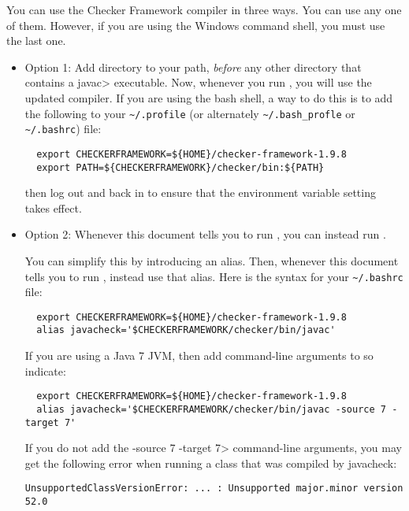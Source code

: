 You can use the Checker Framework compiler in three ways.  You can use any
one of them.  However, if you are using the Windows command shell, you must
use the last one.


\begin{itemize}
  \item
    Option 1:
    Add directory
     to your path, \emph{before} any other
    directory that contains a \<javac> executable.  Now, whenever
    you run , you will use the updated compiler.  If you are
    using the bash shell, a way to do this is to add the following to your
    \verb|~/.profile| (or alternately \verb|~/.bash_profle| or \verb|~/.bashrc|) file:
\begin{Verbatim}
  export CHECKERFRAMEWORK=${HOME}/checker-framework-1.9.8
  export PATH=${CHECKERFRAMEWORK}/checker/bin:${PATH}
\end{Verbatim}
    then log out and back in to ensure that the environment variable
    setting takes effect.
  \item
    \begin{sloppypar}
    Option 2:
    Whenever this document tells you to run , you
    can instead run .
    \end{sloppypar}

    You can simplify this by introducing an alias.  Then,
    whenever this document tells you to run , instead use that
    alias.  Here is the syntax for your
    \verb|~/.bashrc| file:
\begin{Verbatim}
  export CHECKERFRAMEWORK=${HOME}/checker-framework-1.9.8
  alias javacheck='$CHECKERFRAMEWORK/checker/bin/javac'
\end{Verbatim}

    If you are using a Java 7 JVM, then add command-line arguments to so
    indicate:

\begin{Verbatim}
  export CHECKERFRAMEWORK=${HOME}/checker-framework-1.9.8
  alias javacheck='$CHECKERFRAMEWORK/checker/bin/javac -source 7 -target 7'
\end{Verbatim}

   If you do not add the \<-source 7 -target 7> command-line arguments, you
   may get the following error when running a class that was compiled by
   javacheck:
\begin{Verbatim}
UnsupportedClassVersionError: ... : Unsupported major.minor version 52.0
\end{Verbatim}


\end{itemize}

